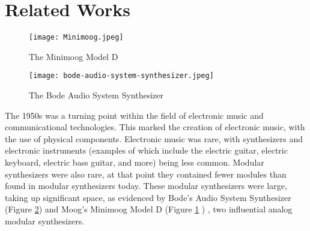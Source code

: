 \section{Related Works}\label{section:mod-synth-history}

\begin{figure}
  \centering
  \texttt{[image: Minimoog.jpeg]}
  \caption{The Minimoog Model D}
  \label{fig:minimoog}
\end{figure}

\begin{figure}
  \centering
  \texttt{[image: bode-audio-system-synthesizer.jpeg]}
  \caption{The Bode Audio System Synthesizer}
  \label{fig:bode-audio-system-synthesizer}
\end{figure}


The 1950s was a turning point within the field of electronic music and communicational technologies. This marked the creation of electronic music, with the use of physical components. Electronic music was rare, with synthesizers and electronic instruments (examples of which include the electric guitar, electric keyboard, electric bass guitar, and more) being less common. Modular synthesizers were also rare, at that point they contained fewer modules than found in modular synthesizers today. These modular synthesizers were large, taking up significant space, as evidenced by Bode's Audio System Synthesizer (Figure \ref{fig:bode-audio-system-synthesizer}) \cite{Crab_2019a} \cite{Says_2014} and Moog's Minimoog Model D (Figure \ref{fig:minimoog} \cite{Krash_2005}) \cite{Pinch_Trocco_1998} \cite{Pinch_Trocco_2004}, two influential analog modular synthesizers.

